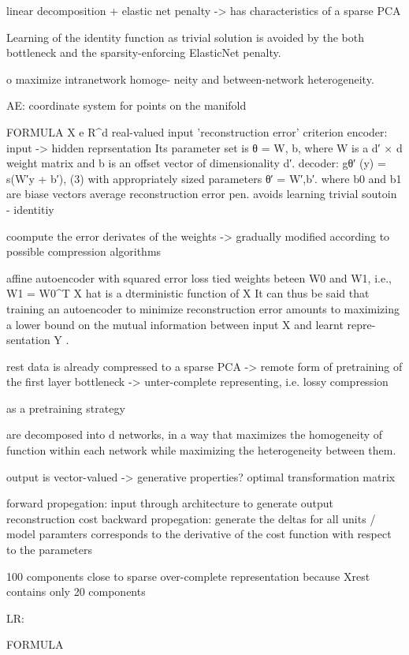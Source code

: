\documentclass{article} %
\begin{document}
linear decomposition + elastic net penalty -> has characteristics of a
sparse PCA

Learning of the identity function as trivial solution is avoided by
the both bottleneck and the sparsity-enforcing ElasticNet penalty.

o maximize intranetwork homoge- neity and between-network heterogeneity. 


AE:
coordinate system for points on the manifold

FORMULA
X e R^d real-valued input
'reconstruction error' criterion
encoder: input -> hidden reprsentation
Its parameter set is θ = {W, b}, where W is a d′ × d weight matrix and b is an offset vector of dimensionality d′.
decoder: gθ′ (y) = s(W′y + b′), (3)
with appropriately sized parameters θ′ = {W′,b′}.
where b0 and b1 are biase vectors
average reconstruction error
pen. avoids learning trivial soutoin - identitiy

coompute the error derivates of the weights
-> gradually modified according to possible compression algorithms


affine autoencoder with squared error loss
tied weights beteen W0 and W1, i.e., W1 = W0^T
X hat is a dterministic function of X
It can thus be said that training an autoencoder to minimize reconstruction error amounts to maximizing a lower bound on the mutual information between input X and learnt repre- sentation Y .

rest data is already compressed to a sparse PCA -> remote form of 
pretraining of the first layer
bottleneck -> unter-complete representing, i.e. lossy compression

as a pretraining strategy

are decomposed into d networks,
in a way that maximizes the homogeneity of
function within each network while maximizing the heterogeneity between them.

output is vector-valued -> generative properties?
optimal transformation matrix 

forward propegation: input through architecture to generate output
reconstruction cost
backward propegation: generate the deltas for all units / model paramters
corresponds to the derivative of the cost function with respect to the parameters



100 components close to sparse over-complete representation because
Xrest contains only 20 components

LR:

FORMULA
\end{document}
